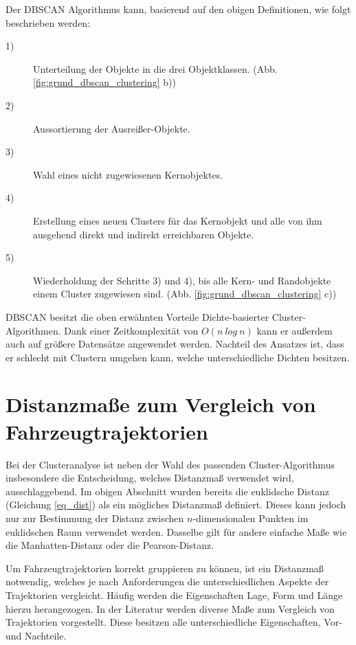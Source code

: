 Der DBSCAN Algorithmus kann, basierend auf den obigen Definitionen, wie folgt beschrieben werden:

\begin{description}
    \item[1)] Unterteilung der Objekte in die drei Objektklassen. (Abb. \ref{fig:grund_dbscan_clustering} b))
    \item[2)] Aussortierung der Ausreißer-Objekte.
    \item[3)] Wahl eines nicht zugewiesenen Kernobjektes.
    \item[4)] Erstellung eines neuen Clusters für das Kernobjekt und alle von ihm ausgehend direkt und indirekt erreichbaren Objekte.
    \item[5)] Wiederholdung der Schritte 3) und 4), bis alle Kern- und Randobjekte einem Cluster zugewiesen sind. (Abb. \ref{fig:grund_dbscan_clustering} c))
\end{description}

DBSCAN besitzt die oben erwähnten Vorteile Dichte-basierter Cluster-Algorithmen. Dank einer Zeitkomplexität
von $O(n\ log\ n)$ kann er außerdem auch auf größere Datensätze angewendet werden.
Nachteil des Ansatzes ist, dass er schlecht mit Clustern umgehen kann, welche unterschiedliche Dichten besitzen.

\section{Distanzmaße zum Vergleich von Fahrzeugtrajektorien}
\label{sec:distance_measures}

Bei der Clusteranalyse ist neben der Wahl des passenden Cluster-Algorithmus insbesondere
die Entscheidung, welches Distanzmaß verwendet wird, ausschlaggebend.
Im obigen Abschnitt wurden bereits die euklidsche Distanz (Gleichung \ref{eq_dist}) als ein mögliches Distanzmaß
definiert. Dieses kann jedoch nur zur Bestimmung der Distanz zwischen $n$-dimensionalen Punkten im euklidschen Raum verwendet
werden. Dasselbe gilt für andere einfache Maße wie die Manhatten-Distanz oder die Pearson-Distanz.

Um Fahrzeugtrajektorien korrekt gruppieren zu können, ist ein Distanzmaß notwendig, welches je nach Anforderungen
die unterschiedlichen Aspekte der Trajektorien vergleicht. Häufig werden die Eigenschaften Lage, Form und Länge
hierzu herangezogen. In der Literatur werden diverse Maße zum Vergleich von Trajektorien vorgestellt. Diese besitzen
alle unterschiedliche Eigenschaften, Vor- und Nachteile.

